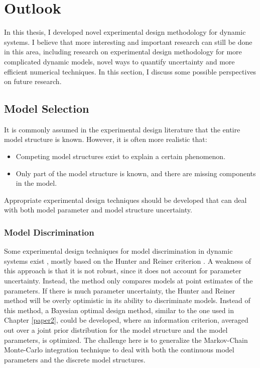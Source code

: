 \section{Outlook}
In this thesis, I developed novel experimental design methodology for dynamic systems. I believe that more interesting and important research can still be done in this area, including research on experimental design methodology for more complicated dynamic models, novel ways to quantify uncertainty and more efficient numerical techniques. In this section, I discuss some possible perspectives on future research.
\subsection{Model Selection}
It is commonly assumed in the experimental design literature that the entire model structure is known. However, it is often more realistic that:
\begin{itemize}
\item Competing model structures exist to explain a certain phenomenon.
\item Only part of the model structure is known, and there are missing components in the model.
\end{itemize}
Appropriate experimental design techniques should be developed that can deal with both model parameter and model structure uncertainty.
\subsubsection{Model Discrimination}
Some experimental design techniques for model discrimination in dynamic systems exist \parencite{chen}, mostly based on the Hunter and Reiner criterion \parencite{hunter}. A weakness of this approach is that it is not robust, since it does not account for parameter uncertainty. Instead, the method only compares models at point estimates of the parameters. If there is much parameter uncertainty, the Hunter and Reiner method will be overly optimistic in its ability to discriminate models. Instead of this method, a Bayesian optimal design method, similar to the one used in Chapter \ref{paper2}, could be developed, where an information criterion, averaged out over a joint prior distribution for the model structure and the model parameters, is optimized. The challenge here is to generalize the Markov-Chain Monte-Carlo integration technique to deal with both the continuous model parameters and the discrete model structures. 
